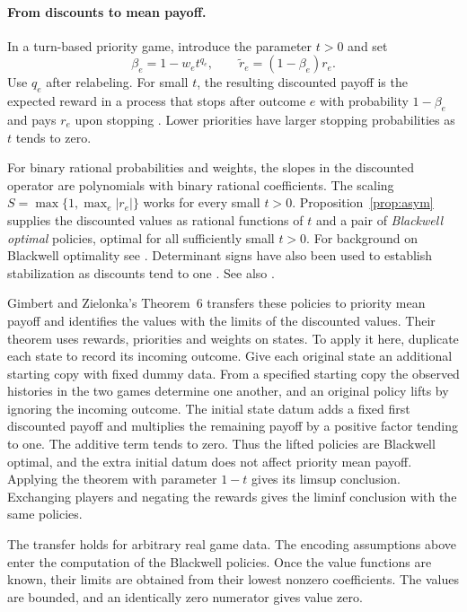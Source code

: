 \paragraph{From discounts to mean payoff.}
In a turn-based priority game, introduce the parameter \(t>0\) and set
\begin{equation}\label{eq:gz}
   \beta_e=1-w_e t^{q_e},\qquad
   \widetilde r_e=(1-\beta_e)r_e .
\end{equation}
Use \(q_e\) after relabeling. For small \(t\), the resulting discounted
payoff is the expected reward in a process that stops after outcome
\(e\) with probability \(1-\beta_e\) and pays \(r_e\) upon stopping
\cite{GZ}. Lower priorities have larger stopping probabilities as
\(t\) tends to zero.

For binary rational probabilities and weights, the slopes in the
discounted operator are polynomials with binary rational coefficients.
The scaling \(S=\max\{1,\max_e|r_e|\}\) works for every small \(t>0\).
Proposition~\ref{prop:asym} supplies the discounted values as rational
functions of \(t\) and a pair of \emph{Blackwell optimal} policies,
optimal for all sufficiently small \(t>0\). For background on
Blackwell optimality see \cite{Bla,AHM,GZDet,GZMD}. Determinant signs
have also been used to establish stabilization as discounts tend to one
\cite{AM,GGK}. See also \cite[Section~2.1]{OAITu}.

Gimbert and Zielonka's Theorem~6 \cite{GZ} transfers these policies
to priority mean payoff and identifies the values with the limits of
the discounted values. Their theorem uses rewards, priorities and
weights on states. To apply it here, duplicate each state to record
its incoming outcome. Give each original state an additional starting
copy with fixed dummy data. From a specified starting copy the observed
histories in the two games determine one another, and an original
policy lifts by ignoring the incoming outcome. The initial state
datum adds a fixed first discounted payoff and multiplies the
remaining payoff by a positive factor tending to one. The additive
term tends to zero. Thus the lifted policies are Blackwell optimal,
and the extra initial datum does not affect priority mean payoff.
Applying the theorem with parameter \(1-t\) gives its limsup
conclusion. Exchanging players and negating the rewards gives the
liminf conclusion with the same policies.

The transfer holds for arbitrary real game data. The encoding
assumptions above enter the computation of the Blackwell policies.
Once the value functions are known, their limits are obtained from
their lowest nonzero coefficients. The values are bounded, and an
identically zero numerator gives value zero.

